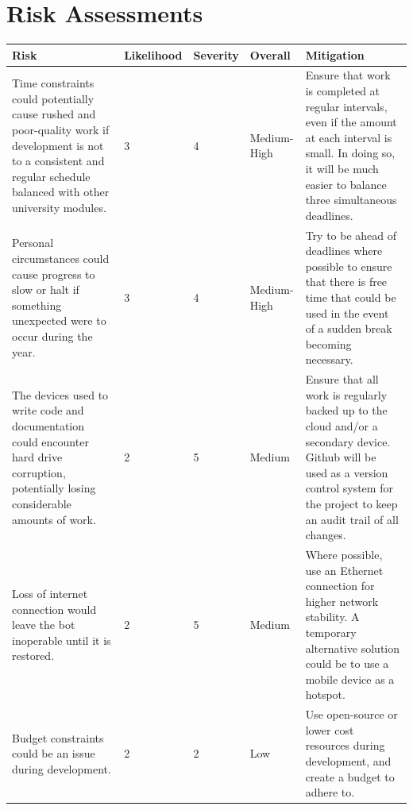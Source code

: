 \documentclass[12pt]{report}
\begin{document}
    \section{Risk Assessments}\label{sec:risks}
    \begin{table}[H]
        \centering
        \begin{tabular}{ |p{}|p{}|p{}|p{}|p{}|}
            \hline
            \cellcolor{blue!25}Risk & \cellcolor{blue!25}Likelihood  &
            \cellcolor{blue!25}Severity & \cellcolor{blue!25}Overall & \cellcolor{blue!25}Mitigation\\
            \hline

            Time constraints could potentially cause rushed and poor-quality work if development is not to a 
            consistent and regular schedule balanced with other university modules. & 3 & 4 & Medium-High &
            Ensure that work is completed at regular intervals, even if the amount at each interval is small. 
            In doing so, it will be much easier to balance three simultaneous deadlines. \\

            \hline

            Personal circumstances could cause progress to slow or halt if something unexpected were to occur
            during the year. & 3 & 4 & Medium-High & Try to be ahead of deadlines where possible to ensure that
            there is free time that could be used in the event of a sudden break becoming necessary.\\
            
            \hline

            The devices used to write code and documentation could encounter hard drive corruption, potentially 
            losing considerable amounts of work. & 2 & 5 & Medium & Ensure that all work is regularly backed up to 
            the cloud and/or a secondary device. Github will be used as a version control system for the project 
            to keep an audit trail of all changes.\\
           
            \hline

            Loss of internet connection would leave the bot inoperable until it is restored. & 2 & 5 & Medium & Where possible,
            use an Ethernet connection for higher network stability. A temporary alternative solution could be to use
            a mobile device as a hotspot. \\

            \hline

            Budget constraints could be an issue during development. & 2 & 2 & Low & Use open-source or lower
            cost resources during development, and create a budget to adhere to. \\ 
            
            \hline

            

        \end{tabular}\label{tab:risks}
    \end{table}
\end{document}
